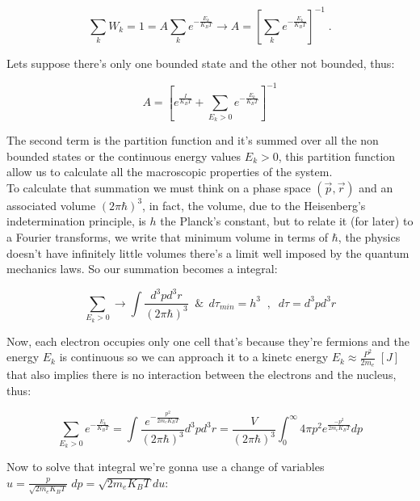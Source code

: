 \documentclass[spanish,notitlepage,letterpaper,11pt]{article} %
\numberwithin{equation}{subsection}
\begin{document}
    \begin{equation*}
        \sum_{k}W_k = 1 = A\sum_ke^{-\frac{E_k}{K_BT}} \rightarrow A = \left[\sum_k e^{-\frac{E_k}{K_BT}} \right]^{-1}\;.
    \end{equation*}

    Lets suppose there's only one bounded state and the other not bounded, thus:

    \begin{equation}\label{eq:A}
        A = \left[e^{\frac{I}{K_BT}} + \sum_{E_k>0}e^{-\frac{E_k}{K_BT}} \right]^{-1}
    \end{equation}

    The second term is the partition function and it's summed over all the non bounded states or the continuous energy values $E_k > 0$, this partition function  allow us to calculate all the macroscopic properties of the system. \\

    To calculate that summation we must think on a phase space $(\Vec{p},\Vec{r})$ and an associated volume $(2\pi\hbar)^3$, in fact, the volume, due to the Heisenberg's indetermination principle, is $h$ the Planck's constant, but to relate it (for later) to a Fourier transforms, we write that minimum volume in terms of $\hbar$, the physics doesn't have infinitely little volumes there's a limit well imposed by the quantum mechanics laws. So our summation becomes a integral:

    \begin{equation*}
        \sum_{E_k>0} \rightarrow \int \frac{d^3pd^3r}{(2\pi\hbar)^3} \;\;\&\;\, d\tau_{min} = h^3 \;\;,\;\; d\tau = d^3pd^3r
    \end{equation*}

    Now, each electron occupies only one cell that's because they're fermions and the energy $E_k$ is continuous so we can approach it to a kinetc energy $E_k \approx \frac{P^2}{2m_e} \;[J]$ that also implies there is no interaction between the electrons and the nucleus, thus:

    \begin{equation*}
        \sum_{E_k > 0}e^{-\frac{E_k}{K_BT}} = \int \frac{e^{-\frac{p^2}{2m_eK_BT}}}{(2\pi\hbar)^3}d^3pd^3r = \frac{V}{(2\pi\hbar)^3}\int_{0}^{\infty}4\pi p^2e^{\frac{-p^2}{2m_eK_BT}}dp
    \end{equation*}

    Now to solve that integral we're gonna use a change of variables $u = \frac{p}{\sqrt{2m_eK_BT}} \;dp = \sqrt{2m_eK_BT}du$:
\end{document}
